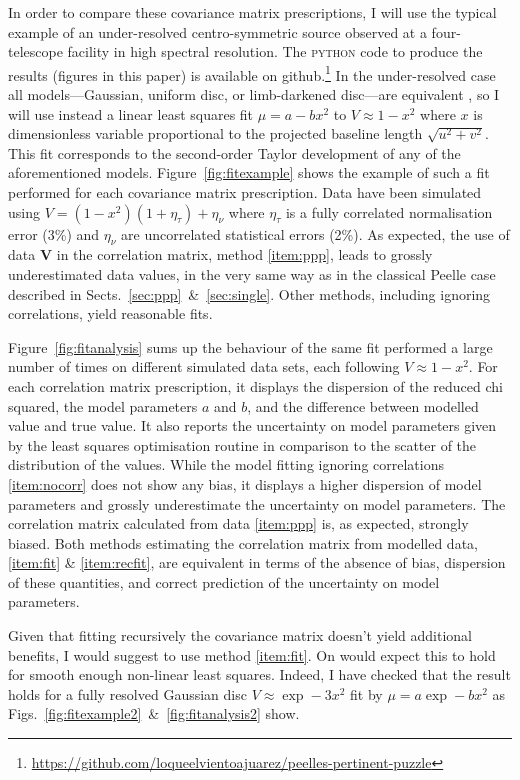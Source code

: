 \documentclass[a4paper,fleqn,usenatbib]{mnras}
\def\vec#1{\ensuremath{\boldsymbol{#1}}}
\def\norm{_\tau}
\def\meas{_\nu}
\def\data{\ensuremath{{\scriptstyle V}}}
\def\vdata{\ensuremath{\vec\data}}
\def\mod{\ensuremath{\mu}}
\def\error{\ensuremath{\eta}}
\def\relerror{\ensuremath{\error\norm}}
\def\abserror{\ensuremath{\error\meas}}
\begin{document}
In order to compare these covariance matrix prescriptions, I will use the typical example of an under-resolved centro-symmetric source observed at a four-telescope facility in high spectral resolution. The \textsc{python} code to produce the results (figures in this paper) is available on github.\footnote{\url{https://github.com/loqueelvientoajuarez/peelles-pertinent-puzzle}} In the under-resolved case all models---Gaussian, uniform disc, or limb-darkened disc---are equivalent \citep{LAC03}, so I will use instead a linear least squares fit $\mod = a - bx^2$ to $\data \approx 1 - x^2$ where $x$ is dimensionless variable proportional to the projected baseline length $\sqrt{u^2+v^2}$. This fit corresponds to the second-order Taylor development of any of the aforementioned models.  Figure~\ref{fig:fitexample} shows the example of such a fit performed for each covariance matrix prescription.  Data have been simulated using $\data = (1-x^2)(1 + \relerror) + \abserror$ where $\relerror$ is a fully correlated normalisation error (3\%) and $\abserror$ are uncorrelated statistical errors (2\%). As expected, the use of data $\vdata$ in the correlation matrix, method \ref{item:ppp}, leads to grossly underestimated data values, in the very same way as in the classical Peelle case described in Sects.~\ref{sec:ppp}~\&~\ref{sec:single}.  Other methods, including ignoring correlations, yield reasonable fits.

Figure~\ref{fig:fitanalysis} sums up the behaviour of the same fit performed a large number of times on different simulated data sets, each following $\data \approx 1-x^2$.  For each correlation matrix prescription, it displays the dispersion of the reduced chi squared, the model parameters $a$ and $b$, and the difference between modelled value and true value. It also reports the uncertainty on model parameters given by the least squares optimisation routine in comparison to the scatter of the distribution of the values. While the model fitting ignoring correlations \ref{item:nocorr} does not show any bias, it displays a higher dispersion of model parameters and grossly underestimate the uncertainty on model parameters.  The correlation matrix calculated from data \ref{item:ppp} is, as expected, strongly biased. Both methods estimating the correlation  matrix from modelled data, \ref{item:fit} \& \ref{item:recfit}, are equivalent in terms of the absence of bias, dispersion of these quantities, and correct prediction of the uncertainty on model parameters.

Given that fitting recursively the covariance matrix doesn't yield additional benefits, I would suggest to use method \ref{item:fit}. On would expect this to hold for smooth enough non-linear least squares. Indeed, I have checked that the result holds for a fully resolved Gaussian disc $\data \approx \exp -3x^2$ fit by $\mod = a\exp -bx^2$ as Figs.~\ref{fig:fitexample2}~\&~\ref{fig:fitanalysis2} show.
\end{document}

